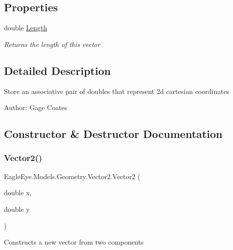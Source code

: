 \subsection*{Properties}
\begin{DoxyCompactItemize}
\item 
double \mbox{\hyperlink{struct_eagle_eye_1_1_models_1_1_geometry_1_1_vector2_ab34c91570ff8b9bd67cec2ddee176893}{Length}}
\begin{DoxyCompactList}\small\item\em Returns the length of this vector \end{DoxyCompactList}\end{DoxyCompactItemize}


\subsection{Detailed Description}
Store an associative pair of doubles that represent 2d cartesian coordinates 

Author\+: Gage Coates

\subsection{Constructor \& Destructor Documentation}
\mbox{\label{struct_eagle_eye_1_1_models_1_1_geometry_1_1_vector2_ab45ce16ef5b5d8abf10b92a8ce38bea0}} 
\subsubsection{\texorpdfstring{Vector2()}{Vector2()}}
{\footnotesize\ttfamily Eagle\+Eye.\+Models.\+Geometry.\+Vector2.\+Vector2 (\begin{DoxyParamCaption}\item[{double}]{x,  }\item[{double}]{y }\end{DoxyParamCaption})}



Constructs a new vector from two components 


